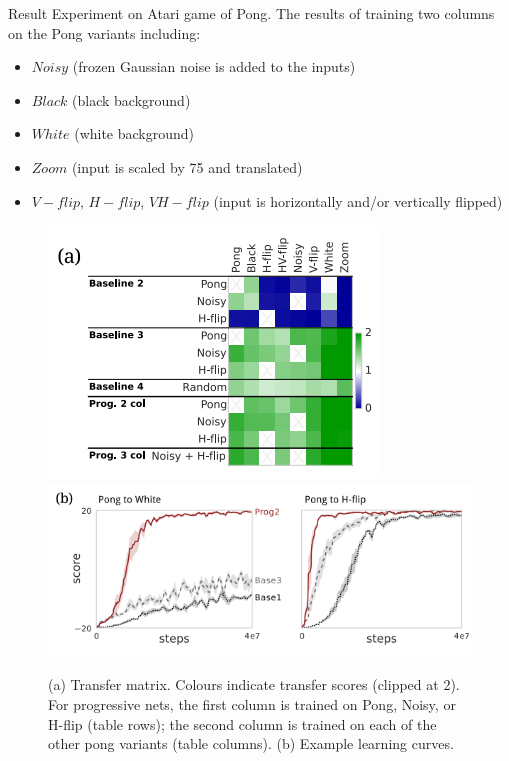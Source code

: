 \documentclass[final, hyperref={pdfpagelabels=false}]{beamer}
\begin{document}
\begin{frame}{}
\begin{columns}[t]
    \begin{column}{0.3\linewidth}
        

    \begin{block}{Result}
        Experiment on Atari game of Pong. The results of training two columns on the Pong variants including:
        \begin{itemize}
            \item $Noisy$ (frozen Gaussian noise is added
to the inputs)
            \item $Black$ (black background)
            \item $White$ (white background)
            \item $Zoom$ (input is scaled by 75%
and translated)
            \item $V-flip$, $H-flip$, $VH-flip$  (input is horizontally and/or vertically flipped)
        \end{itemize}
        \begin{figure}
            \includegraphics[scale=1.4]{img/pongsoupa.png}
            \includegraphics[scale=1.4]{img/pongsoupb.png}
            \caption{(a) Transfer matrix. Colours indicate transfer scores (clipped at 2). For progressive nets, the first column is trained on Pong, Noisy, or H-flip (table rows); the second column is trained on each of the other pong variants (table columns). (b) Example learning curves.}
            \label{fig:eval}
        \end{figure}
    \end{block}


\end{column}
\end{columns}
\end{frame}
\end{document}
